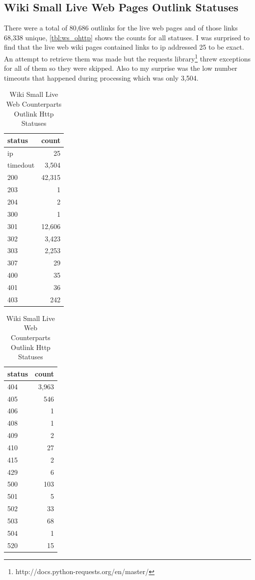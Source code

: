 \documentclass[11pt]{article}
\begin{document}
\subsection*{Wiki Small Live Web Pages Outlink Statuses} 
There were a total of 80,686 outlinks for the live web pages and of those links 68,338 unique, \autoref{tbl:ws_ohttp} shows the counts for all statuses. I was surprised to find that the live web wiki pages contained links to ip addressed 25 to be exact. An attempt to retrieve them was made but the requests library\footnote{http://docs.python-requests.org/en/master/} threw exceptions for all of them so they were skipped. Also to my surprise was the low number timeouts that happened during processing which was only 3,504.
\begin{table}[H]
	\caption{Wiki Small Live Web Counterparts Outlink Http Statuses}
	\label{tbl:ws_ohttp}
	\begin{minipage}{.5\linewidth}
		\centering
		\begin{tabular}{lr}
			\hline
			status   & count \\
			\hline
			ip       & 25    \\
			timedout & 3,504  \\
			200      & 42,315 \\
			203      & 1     \\
			204      & 2     \\
			300      & 1     \\
			301      & 12,606 \\
			302      & 3,423  \\
			303      & 2,253  \\
			307      & 29    \\
			400      & 35    \\
			401      & 36    \\
			403      & 242   \\
			\hline
		\end{tabular}
	\end{minipage} %
	\begin{minipage}{.5\linewidth}
		\centering
		\begin{tabular}{lr}
			\hline
			status & count \\
			\hline
			404      & 3,963  \\
			405    & 546   \\
			406    & 1     \\
			408    & 1     \\
			409    & 2     \\
			410    & 27    \\
			415    & 2     \\
			429    & 6     \\
			500    & 103   \\
			501    & 5     \\
			502    & 33    \\
			503    & 68    \\
			504    & 1     \\
			520    & 15    \\
			\hline
		\end{tabular}
	\end{minipage} 
\end{table}
\end{document}
